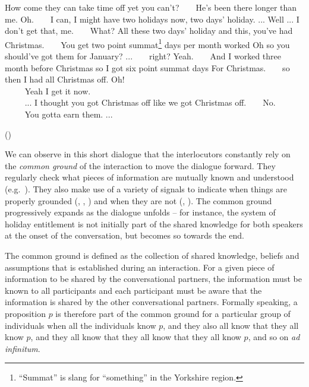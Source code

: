 \begin{dialogue} 
 How come they can take time off yet you can't?
 $\ \ \ \ \ \ $ He's been there longer than me.
 Oh.
  $\ \ \ \ \ \ $ I can, I might have two holidays now, two days' holiday. ...
 Well ... I don't get that, me.
  $\ \ \ \ \ \ $ What?
 All these two days' holiday and this, you've had Christmas.
  $\ \ \ \ \ \ $ You get two point summat\footnote{``Summat'' is slang for ``something'' in the Yorkshire region. } days per month worked
 Oh so you should've got them for January? ...
  $\ \ \ \ \ \ $ right?
 Yeah.
  $\ \ \ \ \ \ $ And I worked three month before Christmas so I got six point summat days
 For Christmas.
  $\ \ \ \ \ \ $ so then I had all Christmas off.
 Oh! \\
 $\phantom{a} \ \ \ \ \ \ \ $ Yeah I get it now. \\
 $\phantom{a} \ \ \ \ \ \ \ $ ... I thought you got Christmas off like we got Christmas off.
  $\ \ \ \ \ \ $ No. \\ 
 $\phantom{a} \ \ \ \ \ \ \ $ You gotta earn them. ... \vspace{-2mm}
 \begin{flushright}\begin{scriptsize}()\end{scriptsize}\end{flushright} 
\end{dialogue} 

We can observe in this short dialogue that the interlocutors constantly rely on the \textit{common ground} of the interaction to move the dialogue forward.  They regularly check what pieces of information are mutually known and understood (e.g.\ ).  They also make use of a variety of signals to indicate when things are properly grounded (, , ) and when they are not (, ). The common ground progressively expands as the dialogue unfolds -- for instance, the system of holiday entitlement is not initially part of the shared knowledge for both speakers at the onset of the conversation, but becomes so towards the end. 

The common ground is defined as the collection of shared knowledge, beliefs and assumptions that is established during an interaction. For a given piece of information to be shared by the conversational partners, the information must be known to all participants and each participant must be aware that the information is shared by the other conversational partners. Formally speaking, a proposition $p$ is therefore part of the common ground for a particular group of individuals when all the individuals know $p$, and they also all know that they all know $p$, and they all know that they all know that they all know $p$, and so on \textit{ad infinitum}.

